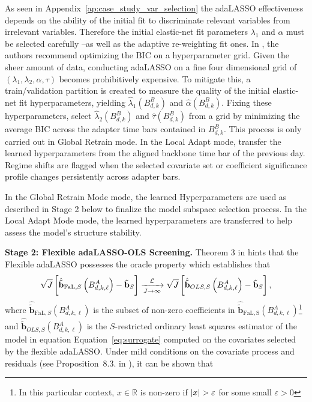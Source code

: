 \documentclass[10pt,a4paper,oneside]{article}
\newcommand{\R}{\mathbb{R}}
\DeclarePairedDelimiter{\aval}{\lvert}{\rvert} %
\providecommand{\DIFaddtex}[1]{{\protect\color{blue} \sf #1}} %
\providecommand{\DIFdeltex}[1]{{\protect\color{red} \scriptsize #1}} %
\providecommand{\DIFaddbegin}{} %
\providecommand{\DIFaddend}{} %
\providecommand{\DIFdelbegin}{} %
\providecommand{\DIFdelend}{} %
\providecommand{\DIFadd}[1]{\texorpdfstring{\DIFaddtex{#1}}{#1}} %
\providecommand{\DIFdel}[1]{\texorpdfstring{\DIFdeltex{#1}}{}} %
\newcommand{\DIFscaledelfig}{0.5}
\newlength{\DIFdelgraphicswidth} %
\newlength{\DIFdelgraphicsheight} %
\newcommand{\DIFaddincludegraphics}[2][]{{\color{blue}\fbox{\DIFOincludegraphics[#1]{#2}}}} %
\newcommand{\DIFdelincludegraphics}[2][]{%
\sbox{\DIFdelgraphicsbox}{\DIFOincludegraphics[#1]{#2}}%
\settoboxwidth{\DIFdelgraphicswidth}{\DIFdelgraphicsbox} %
\settoboxtotalheight{\DIFdelgraphicsheight}{\DIFdelgraphicsbox} %
\scalebox{\DIFscaledelfig}{%
\parbox[b]{\DIFdelgraphicswidth}{\usebox{\DIFdelgraphicsbox}\\[-\baselineskip] \rule{\DIFdelgraphicswidth}{0em}}\llap{\resizebox{\DIFdelgraphicswidth}{\DIFdelgraphicsheight}{%
\setlength{\unitlength}{\DIFdelgraphicswidth}%
\begin{picture}(1,1)%
\thicklines\linethickness{2pt} %
{\color[rgb]{1,0,0}\put(0,0){\framebox(1,1){}}}%
{\color[rgb]{1,0,0}\put(0,0){\line( 1,1){1}}}%
{\color[rgb]{1,0,0}\put(0,1){\line(1,-1){1}}}%
\end{picture}%
}\hspace*{3pt}}} %
} %
\DeclareRobustCommand{\DIFaddbegin}{\DIFOaddbegin \let\includegraphics\DIFaddincludegraphics} %
\DeclareRobustCommand{\DIFaddend}{\DIFOaddend \let\includegraphics\DIFOincludegraphics} %
\DeclareRobustCommand{\DIFdelbegin}{\DIFOdelbegin \let\includegraphics\DIFdelincludegraphics} %
\DeclareRobustCommand{\DIFdelend}{\DIFOaddend \let\includegraphics\DIFOincludegraphics} %
\begin{document}
As seen in Appendix~\ref{ap:case_study_var_selection} the adaLASSO effectiveness depends on the ability of the initial fit to discriminate relevant variables from irrelevant variables. Therefore the initial elastic-net fit parameters \(\lambda_1\) and \(\alpha\) must be selected carefully --as well as the adaptive re-weighting fit ones. In \cite{MEDEIROS2016255}, the authors recommend optimizing the BIC on a hyperparameter grid. Given the sheer amount of data, conducting adaLASSO on a fine four dimensional grid of \((\lambda_1, \lambda_2, \alpha, \tau)\) becomes prohibitively expensive. To mitigate this, a train/validation partition is created to measure the quality of the initial elastic-net fit hyperparameters, yielding  \(\hat{\lambda}_1 \left( B^B_{d, k} \right)\) and \(\hat{\alpha}\left( B^B_{d, k} \right)\). Fixing these hyperparameters, select \(\hat{\lambda}_2\left( B^B_{d, k} \right)\) and \(\hat{\tau}\left( B^B_{d,k} \right)\) from a grid by minimizing the average BIC across the adapter time bars contained in \(B^B_{d,k}\). This process is only carried out in Global Retrain mode. In the Local Adapt mode, transfer the learned hyperparameters from the aligned backbone time bar of the previous day. Regime shifts are flagged when the selected covariate set or coefficient significance profile changes persistently across adapter bars.

In the Global Retrain \DIFdelbegin \DIFdel{Mode}\DIFdelend \DIFaddbegin \DIFadd{mode}\DIFaddend , the learned Hyperparameters are used as described in Stage 2 below to finalize the model subspace selection process. In the Local Adapt \DIFdelbegin \DIFdel{Mode}\DIFdelend \DIFaddbegin \DIFadd{mode}\DIFaddend , the learned hyperparameters are transferred to help assess the model's structure stability.
\medskip

\noindent\textbf{Stage 2: Flexible adaLASSO-OLS Screening.} Theorem 3 in \cite{MEDEIROS2016255} hints that the Flexible adaLASSO possesses the oracle property which establishes that
$$
    \sqrt{J} \left[\hat{\tilde{\mathbf{b}}}_{\mathrm{FaL},S} \left( B^A_{d, k, \ell} \right) - \tilde{\mathbf{b}}_S \right] \xrightarrow[J \rightarrow \infty]{\mathcal{L}}\\ \sqrt{J} \left[\hat{\tilde{\mathbf{b}}}_{OLS, S} \left( B^A_{d, k, \ell} \right) - \tilde{\mathbf{b}}_S\right],
$$
where $\hat{\tilde{\mathbf{b}}}_{\mathrm{FaL},S}\left( B^A_{d, k, \ell} \right)$ is the subset of non-zero coefficients in $\hat{\tilde{\mathbf{b}}}_{\mathrm{FaL,S}}\left( B^A_{d, k, \ell} \right)$\footnote{In this particular context, $x \in \R$ is non-zero if $\aval{x} > \varepsilon$ for some small $\varepsilon > 0$} and $\hat{\tilde{\mathbf{b}}}_{OLS, S}\left( B^A_{d, k, \ell} \right)$ is the $S$-restricted ordinary least squares estimator of the model in \DIFdelbegin \DIFdel{equation}\DIFdelend \DIFaddbegin \DIFadd{Equation}\DIFaddend ~\eqref{eq:surrogate} computed on the covariates selected by the flexible adaLASSO. Under mild conditions on the covariate process and residuals (see Proposition~8.3. in \cite{hamilton_time_1994}), it can be shown that
\end{document}
